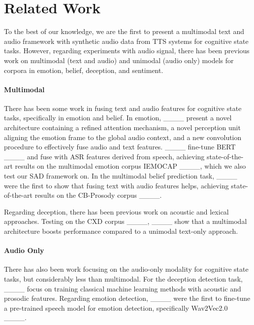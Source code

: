 \section{Related Work}
\label{sec:prev}
To the best of our knowledge, we are the first to present a multimodal text and audio framework with synthetic audio data from TTS systems for cognitive state tasks.
However, regarding experiments with audio signal, there has been previous work on multimodal (text and audio) and unimodal (audio only) models for corpora in emotion, belief, deception, and sentiment. 

\paragraph{Multimodal} There has been some work in fusing text and audio features for cognitive state tasks, specifically in emotion and belief. In emotion, 
____ present a novel architecture containing a refined attention mechanism, a novel perception unit aligning the emotion frame to the global audio context, and a new convolution procedure to effectively fuse audio and text features.
____ fine-tune BERT ____ and fuse with ASR features derived from speech, achieving state-of-the-art results on the multimodal emotion corpus IEMOCAP ____, which we also test our SAD framework on.
In the multimodal belief prediction task, ____ were the first to show that fusing text with audio features helps, achieving state-of-the-art results on the CB-Prosody corpus ____. 

Regarding deception, there has been previous work on acoustic and lexical approaches.  Testing on the CXD corpus ____, ____ show that a multimodal architecture boosts performance compared to a unimodal text-only approach.

\paragraph{Audio Only} There has also been work focusing on the audio-only modality for cognitive state tasks, but considerably less than multimodal. For the deception detection task, ____ focus on training classical machine learning methods with acoustic and prosodic features. Regarding emotion detection, ____ were the first to fine-tune a pre-trained speech model for emotion detection, specifically Wav2Vec2.0 ____.